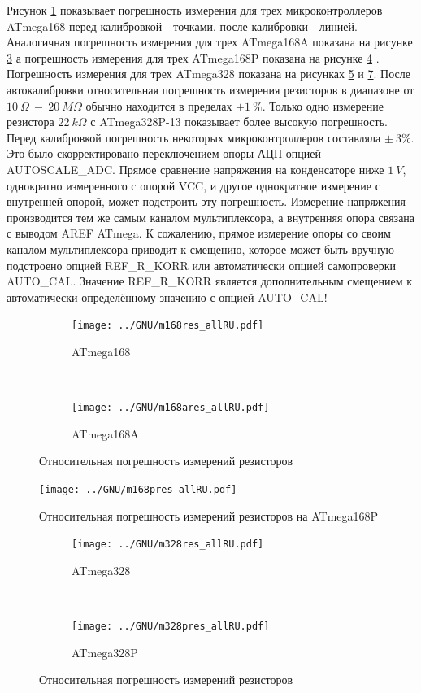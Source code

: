 Рисунок \ref{fig:m168res_all} показывает погрешность измерения для трех микроконтроллеров ATmega168 перед 
калибровкой - точками, после калибровки - линией. Аналогичная погрешность измерения для трех ATmega168A показана 
на рисунке \ref{fig:m168ares_all} а погрешность измерения для трех ATmega168P показана на 
рисунке \ref{fig:m168pres_all} .
Погрешность измерения для трех ATmega328 показана на рисунках \ref{fig:m328res_all} и \ref{fig:m328pres_all}.
После автокалибровки относительная погрешность измерения резисторов в диапазоне от \(10~\Omega~-~20~M\Omega\) 
обычно находится в пределах \(\pm1~\%\). Только одно измерение резистора \(22~k\Omega\) с ATmega328P-13 показывает 
более высокую погрешность. Перед калибровкой погрешность некоторых микроконтроллеров составляла \(\pm~3\%\).
Это было скорректировано переключением опоры АЦП опцией AUTOSCALE\_ADC. Прямое сравнение напряжения на конденсаторе 
ниже \(1~V\), однократно измеренного с опорой VCC, и другое однократное измерение с внутренней опорой, может подстроить 
эту погрешность. Измерение напряжения производится тем же самым каналом мультиплексора, а внутренняя опора связана 
с выводом AREF ATmega. К сожалению, прямое измерение опоры со своим каналом мультиплексора приводит к смещению, 
которое  может быть вручную подстроено опцией  REF\_R\_KORR или автоматически опцией самопроверки AUTO\_CAL. 
Значение REF\_R\_KORR является дополнительным смещением к автоматически определённому значению с опцией AUTO\_CAL!

\begin{figure}[H]
  \begin{subfigure}[b]{.5\textwidth}
    \centering
    \texttt{[image: ../GNU/m168res\_allRU.pdf]}
    \caption{ATmega168}
    \label{fig:m168res_all}
  \end{subfigure}
  ~
  \begin{subfigure}[b]{.5\textwidth}
    \centering
    \texttt{[image: ../GNU/m168ares\_allRU.pdf]}
    \caption{ATmega168A}
    \label{fig:m168ares_all}
  \end{subfigure}
\caption{Относительная погрешность измерений резисторов}
\end{figure}

\begin{figure}[H]
\centering
\texttt{[image: ../GNU/m168pres\_allRU.pdf]}
\caption{Относительная погрешность измерений резисторов на ATmega168P }
\label{fig:m168pres_all}
\end{figure}

\begin{figure}[H]
  \begin{subfigure}[b]{.5\textwidth}
    \centering
    \texttt{[image: ../GNU/m328res\_allRU.pdf]}
    \caption{ATmega328}
    \label{fig:m328res_all}
  \end{subfigure}
  ~
  \begin{subfigure}[b]{.5\textwidth}
    \centering
    \texttt{[image: ../GNU/m328pres\_allRU.pdf]}
    \caption{ATmega328P}
    \label{fig:m328pres_all}
  \end{subfigure}
\caption{Относительная погрешность измерений резисторов}
\end{figure}

